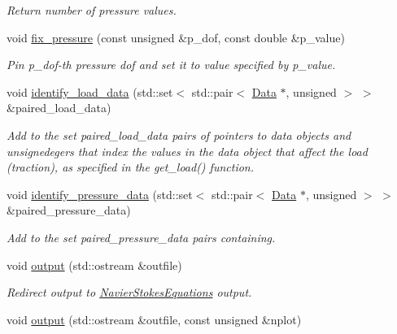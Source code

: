 \begin{DoxyCompactItemize}
\begin{DoxyCompactList}\small\item\em Return number of pressure values. \end{DoxyCompactList}\item 
void \hyperlink{classoomph_1_1GeneralisedNewtonianAxisymmetricTCrouzeixRaviartElement_ae423d454bc4443e5b48573c8e7bc7671}{fix\+\_\+pressure} (const unsigned \&p\+\_\+dof, const double \&p\+\_\+value)
\begin{DoxyCompactList}\small\item\em Pin p\+\_\+dof-\/th pressure dof and set it to value specified by p\+\_\+value. \end{DoxyCompactList}\item 
void \hyperlink{classoomph_1_1GeneralisedNewtonianAxisymmetricTCrouzeixRaviartElement_aa8be933ba9c625f32b7b158ec91c7092}{identify\+\_\+load\+\_\+data} (std\+::set$<$ std\+::pair$<$ \hyperlink{classoomph_1_1Data}{Data} $\ast$, unsigned $>$ $>$ \&paired\+\_\+load\+\_\+data)
\begin{DoxyCompactList}\small\item\em Add to the set paired\+\_\+load\+\_\+data pairs of pointers to data objects and unsignedegers that index the values in the data object that affect the load (traction), as specified in the get\+\_\+load() function. \end{DoxyCompactList}\item 
void \hyperlink{classoomph_1_1GeneralisedNewtonianAxisymmetricTCrouzeixRaviartElement_a59c693fd6a19fd39627776cd68ba0382}{identify\+\_\+pressure\+\_\+data} (std\+::set$<$ std\+::pair$<$ \hyperlink{classoomph_1_1Data}{Data} $\ast$, unsigned $>$ $>$ \&paired\+\_\+pressure\+\_\+data)
\begin{DoxyCompactList}\small\item\em Add to the set {\ttfamily paired\+\_\+pressure\+\_\+data} pairs containing. \end{DoxyCompactList}\item 
void \hyperlink{classoomph_1_1GeneralisedNewtonianAxisymmetricTCrouzeixRaviartElement_aa8244861e7f531652f105fabfc580efc}{output} (std\+::ostream \&outfile)
\begin{DoxyCompactList}\small\item\em Redirect output to \hyperlink{classoomph_1_1NavierStokesEquations}{Navier\+Stokes\+Equations} output. \end{DoxyCompactList}\item 
void \hyperlink{classoomph_1_1GeneralisedNewtonianAxisymmetricTCrouzeixRaviartElement_a645fbf96a334ee860b036dfd24858651}{output} (std\+::ostream \&outfile, const unsigned \&nplot)

\end{DoxyCompactItemize}
